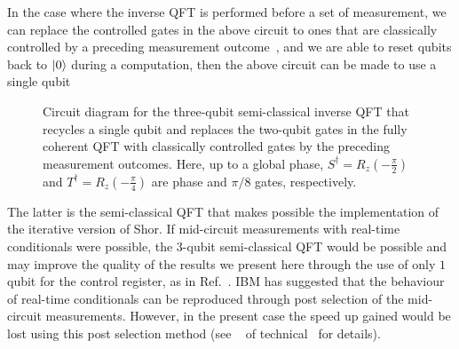 \noindent
In the case where the inverse \acs{QFT} is performed before a set of measurement, we can replace the controlled gates in the above circuit to ones that are classically controlled by a preceding measurement outcome~\cite{Griffiths_1996}, and we are able to reset qubits back to $\ket{0}$ during a computation, then the above circuit can be made to use a single qubit~\cite{Parker_2000}

\begin{figure}[h]
	\centering
	\caption[Circuit diagram for the three-qubit semi-classical inverse \acs{QFT}.]{Circuit diagram for the three-qubit semi-classical inverse \acs{QFT} that recycles a single qubit and replaces the two-qubit gates in the fully coherent \acs{QFT} with classically controlled gates by the preceding measurement outcomes. Here, up to a global phase, ${S^{\dagger}= R_z(-\frac{\pi}{2})}$ and ${T^{\dagger} = R_z(-\frac{\pi}{4})}$ are phase and ${\pi/8}$ gates, respectively.}
\end{figure}


\noindent
The latter is the semi-classical \acs{QFT} that makes possible the implementation of the iterative version of Shor. If mid-circuit measurements with real-time conditionals were possible, the $3$-qubit semi-classical \acs{QFT} would be possible and may improve the quality of the results we present here through the use of only $1$ qubit for the control register, as in Ref.~\cite{Lopez_2012}. IBM has suggested that the behaviour of real-time conditionals can be reproduced through post selection of the mid-circuit measurements. However, in the present case the speed up gained would be lost using this post selection method (see ~ of technical~ for details).

